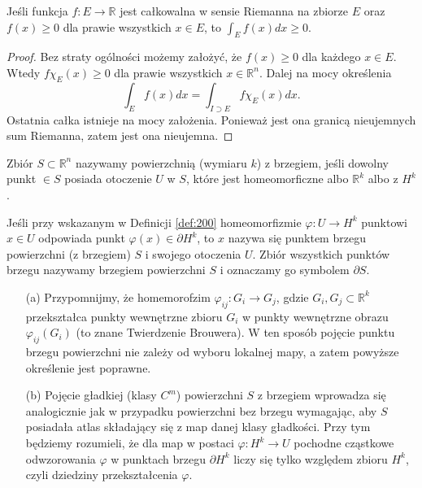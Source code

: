 \documentclass[leqno]{article}
\newcounter{defcounter}
\newcounter{uwagacounter}
\begin{document}
\begin{justify}
\begin{theorem}
{
    Jeśli funkcja $f : E \to \mathbb{R}$ jest całkowalna w sensie Riemanna na zbiorze $E$ oraz $f(x) \geqslant 0$ dla prawie wszystkich $x \in E$, to $\int_{E}f(x)dx \geqslant 0$.
}
\end{theorem}

\begin{proof}
    Bez straty ogólności możemy założyć, że $f(x) \geqslant 0$ dla każdego $x \in E$. Wtedy $f\chi_E(x) \geqslant 0$ dla prawie wszystkich $x \in \mathbb{R}^n$.
    Dalej na mocy określenia 
    \[
        \int_E f(x)dx = \int_{I \supset E}f\chi_E(x)dx.
    \]
    Ostatnia całka istnieje na mocy założenia. Ponieważ jest ona granicą nieujemnych sum Riemanna, zatem jest ona nieujemna.
\end{proof}











\newpage

\setcounter{defcounter}{199}
\setcounter{uwagacounter}{104}

\begin{defn}
    Zbiór $S \subset \mathbb{R}^n$ nazywamy powierzchnią (wymiaru $k$) z brzegiem, jeśli dowolny punkt $ \in S$ posiada otoczenie $U$ w $S$,
    które jest homeomorficzne albo $\mathbb{R}^k$ albo z $H^k$. 
\end{defn}

\begin{defn}
    Jeśli przy wskazanym w Definicji \ref{def:200} homeomorfizmie $\varphi : U \to H^k$ punktowi $x \in U$ odpowiada punkt $\varphi(x) \in \partial H^k$, to 
    $x$ nazywa się punktem brzegu powierzchni (z brzegiem) $S$ i swojego otoczenia $U$. Zbiór wszystkich punktów brzegu nazywamy brzegiem powierzchni $S$ 
    i oznaczamy go symbolem $\partial S$. 
\end{defn}

\begin{uwaga}
    \begin{itemize}
        \item [(a)] Przypomnijmy, że homemorofzim $\varphi_{ij} : G_i \to G_j$, gdzie $G_i, G_j \subset \mathbb{R}^k$ przekształca 
            punkty wewnętrzne zbioru $G_i$ w punkty wewnętrzne obrazu $\varphi_{ij}(G_i)$ (to znane Twierdzenie Brouwera). 
            W ten sposób pojęcie punktu brzegu powierzchni nie zależy od wyboru lokalnej mapy, a zatem powyższe określenie jest poprawne. 
        \item [(b)]
            Pojęcie gładkiej (klasy $C^m$) powierzchni $S$ z brzegiem wprowadza się analogicznie jak w przypadku powierzchni bez brzegu wymagając, aby $S$
            posiadała atlas składający się z map danej klasy gładkości. Przy tym będziemy rozumieli, że dla map w postaci $\varphi : H^k \to U$
            pochodne cząstkowe odwzorowania $\varphi$ w punktach brzegu $\partial H^k$ liczy się tylko względem zbioru $H^k$, czyli dziedziny przekształcenia $\varphi$. 
    \end{itemize}
\end{uwaga}



\end{justify}
\end{document}
